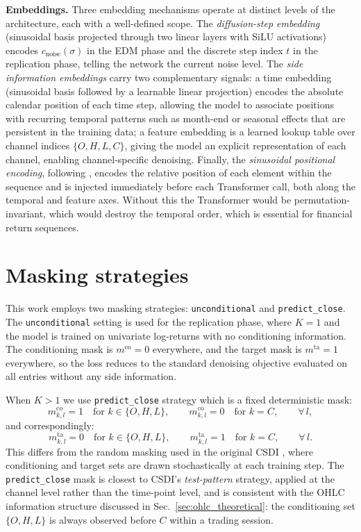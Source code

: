 \textbf{Embeddings.} Three embedding mechanisms operate at distinct 
levels of the architecture, each with a well-defined scope. The 
\emph{diffusion-step embedding} (sinusoidal basis projected through two 
linear layers with SiLU activations) encodes \(c_{\text{noise}}(\sigma)\) 
in the EDM phase and the discrete step index \(t\) in the replication 
phase, telling the network the current noise level. The \emph{side information embeddings} 
carry two complementary signals: a time embedding (sinusoidal basis 
followed by a learnable linear projection) encodes the absolute calendar 
position of each time step, allowing the model to associate positions 
with recurring temporal patterns such as month-end or seasonal effects 
that are persistent in the training data; a feature 
embedding is a learned lookup table over channel indices \(\{O, H, L, 
C\}\), giving the model an explicit representation of each channel, enabling channel-specific denoising. Finally, the 
\emph{sinusoidal positional encoding}, following \cite{kim2025diffusion}, 
encodes the relative position of each element within the sequence and is 
injected immediately before each Transformer call, both along the 
temporal and feature axes. Without this the Transformer would be permutation-invariant, which would destroy the temporal order, which is essential for financial return sequences.

\section{Masking strategies}

This work employs two masking strategies: \texttt{unconditional} and \texttt{predict\_close}. The \texttt{unconditional} setting is used for 
the replication phase, where \(K=1\) and the model is trained on 
univariate log-returns with no conditioning information. The conditioning 
mask is \(m^{\text{co}}=0\) everywhere, and the target mask is 
\(m^{\text{ta}}=1\) everywhere, so the loss reduces to the 
standard denoising objective evaluated on all entries without any side information.

When \(K>1\) we use \texttt{predict\_close} strategy which is a fixed deterministic mask:
\[
    m^{\text{co}}_{k,l} = 1 \quad \text{for } k \in \{O,H,L\}, 
    \qquad
    m^{\text{co}}_{k,l} = 0 \quad \text{for } k = C, 
    \qquad \forall\, l,
\]
and correspondingly:
\[
    m^{\text{ta}}_{k,l} = 0 \quad \text{for } k \in \{O,H,L\}, 
    \qquad
    m^{\text{ta}}_{k,l} = 1 \quad \text{for } k = C, 
    \qquad \forall\, l.
\]
This differs from the random masking used in the original CSDI 
\cite{tashiro2021csdi}, where conditioning and target sets are drawn 
stochastically at each training step. The \texttt{predict\_close} mask 
is closest to CSDI's \emph{test-pattern} strategy, applied at the 
channel level rather than the time-point level, and is consistent with 
the OHLC information structure discussed in 
Sec.~\ref{sec:ohlc_theoretical}: the conditioning set \(\{O,H,L\}\) 
is always observed before \(C\) within a trading session.

